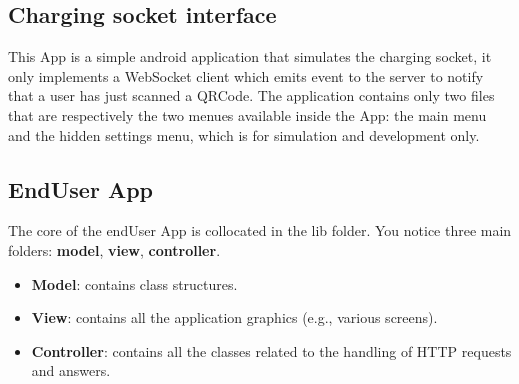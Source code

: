 \subsection{Charging socket interface}
This App is a simple android application that simulates the charging socket, it only implements a WebSocket client which emits event to the server to notify that a user has just scanned a QRCode. The application contains only two files that are respectively the two menues available inside the App: the main menu and the hidden settings menu, which is for simulation and development only.
\subsection{EndUser App}
The core of the endUser App is collocated in the lib folder. You notice three main folders: \textbf{model}, \textbf{view}, \textbf{controller}.
\begin{itemize}
    \item \textbf{Model}: contains class structures.
    \item \textbf{View}: contains all the application graphics (e.g., various screens).
    \item \textbf{Controller}: contains all the classes related to the handling of HTTP requests and answers.
\end{itemize}
















